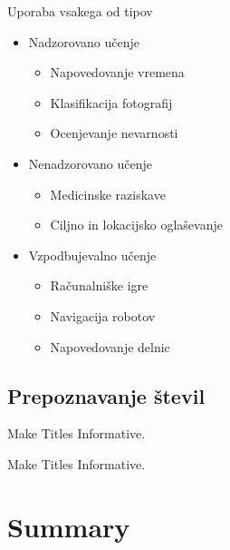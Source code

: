 \documentclass{beamer}
\begin{document}
\begin{frame}{Uporaba vsakega od tipov}
  \begin{itemize}
  \item
   Nadzorovano učenje
	\begin{itemize}
  	\item
   	  Napovedovanje vremena
  	\item
   	  \alert{Klasifikacija fotografij}
  	\item
   	  Ocenjevanje nevarnosti
	\end{itemize}
  \item
  Nenadzorovano učenje
    	\begin{itemize}
  	\item
   	  Medicinske raziskave
  	\item
   	  \alert{Ciljno in lokacijsko oglaševanje}
	\end{itemize}
  \item
   Vzpodbujevalno učenje
 	\begin{itemize}
  	\item
   	  Računalniške igre
  	\item
   	  \alert{Navigacija robotov}
  	\item
   	  Napovedovanje delnic
	\end{itemize}
  \end{itemize}
\end{frame}


\subsection{Prepoznavanje števil}

\begin{frame}{Make Titles Informative.}
\end{frame}

\begin{frame}{Make Titles Informative.}
\end{frame}





\section*{Summary}
\end{document}
